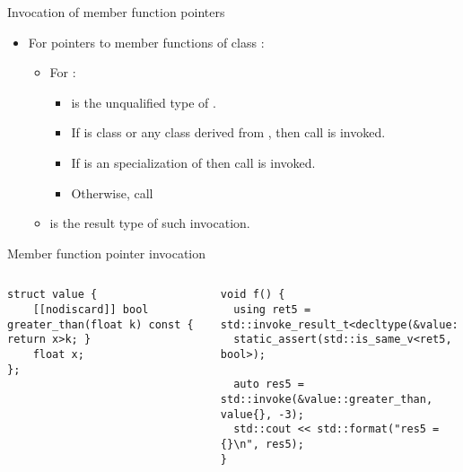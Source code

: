\begin{frame}[t,fragile]{Invocation of member function pointers}
\begin{itemize}
  \item For pointers to member functions of class :
    \begin{itemize}
      \item For :
        \begin{itemize}
          \item {} is the unqualified type of .
          \item If  is class  or any class derived from ,
                then call  is invoked.
          \item If  is an specialization of 
                then call  is invoked.
          \item Otherwise,
                call 
        \end{itemize}
       \item {} 
             is the result type of such invocation.
    \end{itemize}
\end{itemize}
\begin{block}{Member function pointer invocation}
\begin{columns}[T]

\begin{lstlisting}[basicstyle=\tiny]
struct value {
    [[nodiscard]] bool greater_than(float k) const { return x>k; }
    float x;
};
\end{lstlisting}

\begin{lstlisting}[basicstyle=\tiny]
void f() {
  using ret5 = std::invoke_result_t<decltype(&value::greater_than),value,double>;
  static_assert(std::is_same_v<ret5, bool>);

  auto res5 = std::invoke(&value::greater_than, value{}, -3);
  std::cout << std::format("res5 = {}\n", res5);
}
\end{lstlisting}
\end{columns}
\end{block}
\end{frame}


